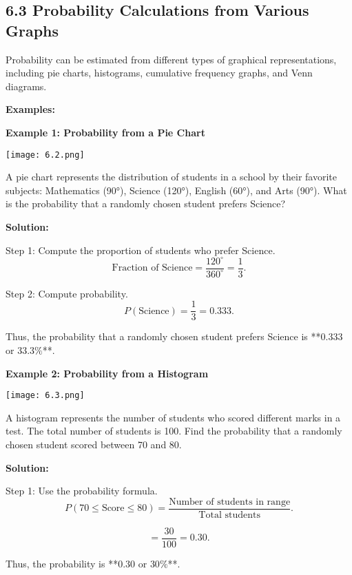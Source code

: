 
\subsection*{6.3 Probability Calculations from Various Graphs}
Probability can be estimated from different types of graphical representations, including pie charts, histograms, cumulative frequency graphs, and Venn diagrams.

\textbf{Examples:}

\begin{flushleft}
	\textbf{Example 1: Probability from a Pie Chart}
	\begin{center}
		\texttt{[image: 6.2.png]}
	\end{center}
	
	A pie chart represents the distribution of students in a school by their favorite subjects: Mathematics (90°), Science (120°), English (60°), and Arts (90°). What is the probability that a randomly chosen student prefers Science?
	
	\textbf{Solution:}
	
	Step 1: Compute the proportion of students who prefer Science.
	\[
	\text{Fraction of Science} = \frac{120^\circ}{360^\circ} = \frac{1}{3}.
	\]
	
	Step 2: Compute probability.
	\[
	P(\text{Science}) = \frac{1}{3} = 0.333.
	\]
	
	Thus, the probability that a randomly chosen student prefers Science is **$0.333$ or $33.3\%$**.
\end{flushleft}

\begin{flushleft}
	\textbf{Example 2: Probability from a Histogram}
	\begin{center}
		\texttt{[image: 6.3.png]}
	\end{center}
	
	
	A histogram represents the number of students who scored different marks in a test. The total number of students is 100. Find the probability that a randomly chosen student scored between 70 and 80.
	
	\textbf{Solution:}
	
	Step 1: Use the probability formula.
	\[
	P(70 \leq \text{Score} \leq 80) = \frac{\text{Number of students in range}}{\text{Total students}}.
	\]
	
	\[
	= \frac{30}{100} = 0.30.
	\]
	
	Thus, the probability is **$0.30$ or $30\%$**.
\end{flushleft}

